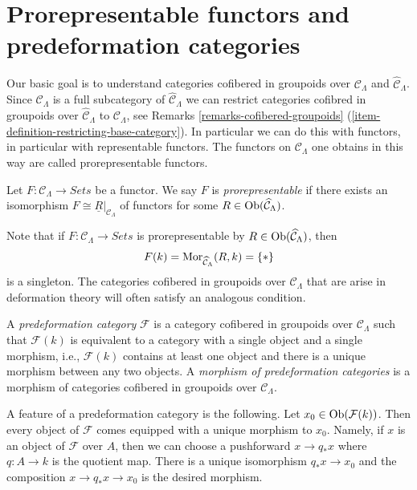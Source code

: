 \section{Prorepresentable functors and predeformation categories}
\label{section-cofibered-groupoids}

\noindent
Our basic goal is to understand categories cofibered in groupoids over
$\mathcal{C}_\Lambda$ and $\widehat{\mathcal{C}}_\Lambda$. Since
$\mathcal{C}_\Lambda$ is a full subcategory of
$\widehat{\mathcal{C}}_\Lambda$ we can restrict categories cofibred in
groupoids over $\widehat{\mathcal{C}}_\Lambda$ to $\mathcal{C}_\Lambda$, see
Remarks \ref{remarks-cofibered-groupoids}
(\ref{item-definition-restricting-base-category}).
In particular we can do this with functors, in particular with
representable functors. The functors on $\mathcal{C}_\Lambda$
one obtains in this way are called
prorepresentable functors.

\begin{definition}
\label{definition-prorepresentable}
Let $F : \mathcal{C}_\Lambda \to \textit{Sets}$ be a functor.
We say $F$ is {\it prorepresentable} if there exists an isomorphism
$F \cong \underline{R}|_{\mathcal{C}_\Lambda}$ of functors for some
$R \in \mathop{\mathrm{Ob}}\nolimits(\widehat{\mathcal{C}}_\Lambda)$.
\end{definition}

\noindent
Note that if $F : \mathcal{C}_\Lambda \to \textit{Sets}$ is prorepresentable
by $R \in \mathop{\mathrm{Ob}}\nolimits(\widehat{\mathcal{C}}_\Lambda)$, then
$$
F(k) = \mathop{\mathrm{Mor}}\nolimits_{\widehat{\mathcal{C}}_\Lambda}(R, k) = \{*\}
$$
is a singleton. The categories cofibered in groupoids over
$\mathcal{C}_\Lambda$ that are arise in deformation theory will often satisfy
an analogous condition.

\begin{definition}
\label{definition-predeformation-category}
A {\it predeformation category} $\mathcal{F}$ is a category cofibered
in groupoids over $\mathcal{C}_\Lambda$ such that $\mathcal{F}(k)$ is
equivalent to a category with a single object and a single morphism,
i.e., $\mathcal{F}(k)$ contains at least one object and there is a
unique morphism between any two objects. A {\it morphism of predeformation
categories} is a morphism of categories cofibered in groupoids over
$\mathcal{C}_\Lambda$.
\end{definition}

\noindent
A feature of a predeformation category is the following.
Let $x_0 \in \mathop{\mathrm{Ob}}\nolimits(\mathcal{F}(k))$. Then every object of
$\mathcal{F}$ comes equipped with a unique morphism to $x_0$.
Namely, if $x$ is an object of $\mathcal{F}$ over $A$, then we
can choose a pushforward $x \to q_*x$ where $q : A \to k$ is the quotient
map. There is a unique isomorphism $q_*x \to x_0$ and the composition
$x \to q_*x \to x_0$ is the desired morphism.

